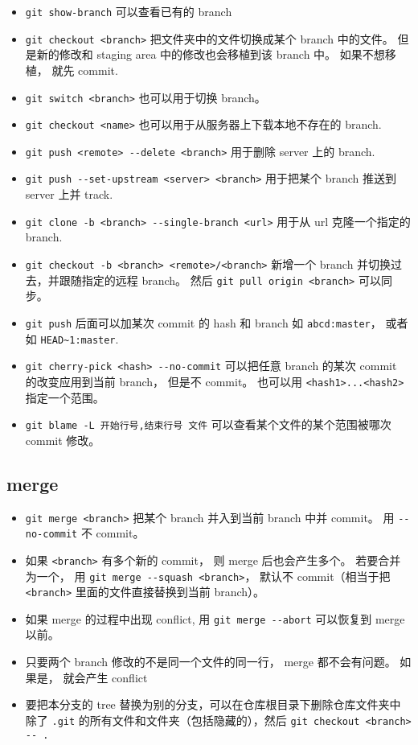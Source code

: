 \begin{itemize}
\item \verb`git show-branch` 可以查看已有的 branch 
\item \verb`git checkout <branch>` 把文件夹中的文件切换成某个 branch 中的文件。 但是新的修改和 staging area 中的修改也会移植到该 branch 中。 如果不想移植， 就先 commit.
\item \verb`git switch <branch>` 也可以用于切换 branch。
\item \verb`git checkout <name>` 也可以用于从服务器上下载本地不存在的 branch.
\item \verb`git push <remote> --delete <branch>` 用于删除 server 上的 branch.
\item \verb`git push --set-upstream <server> <branch>` 用于把某个 branch 推送到 server 上并 track.
\item \verb`git clone -b <branch> --single-branch <url>` 用于从 url 克隆一个指定的 branch.
\item \verb`git checkout -b <branch> <remote>/<branch>` 新增一个 branch 并切换过去，并跟随指定的远程 branch。 然后 \verb`git pull origin <branch>` 可以同步。
\item \verb`git push` 后面可以加某次 commit 的 hash 和 branch 如 \verb`abcd:master`， 或者如 \verb`HEAD~1:master`.
\item \verb`git cherry-pick <hash> --no-commit` 可以把任意 branch 的某次 commit 的改变应用到当前 branch， 但是不 commit。 也可以用 \verb`<hash1>...<hash2>` 指定一个范围。
\item \verb`git blame -L 开始行号,结束行号 文件`  可以查看某个文件的某个范围被哪次 commit 修改。
\end{itemize}

\subsection{merge}
\begin{itemize}
\item \verb`git merge <branch>` 把某个 branch 并入到当前 branch 中并 commit。 用 \verb`--no-commit` 不 commit。
\item 如果 \verb`<branch>` 有多个新的 commit， 则 merge 后也会产生多个。 若要合并为一个， 用 \verb`git merge --squash <branch>`， 默认不 commit（相当于把 \verb`<branch>` 里面的文件直接替换到当前 branch）。
\item 如果 merge 的过程中出现 conflict, 用 \verb`git merge --abort` 可以恢复到 merge 以前。
\item 只要两个 branch 修改的不是同一个文件的同一行， merge 都不会有问题。 如果是， 就会产生 conflict
\item 要把本分支的 tree 替换为别的分支，可以在仓库根目录下删除仓库文件夹中除了 \verb`.git` 的所有文件和文件夹（包括隐藏的），然后 \verb`git checkout <branch> -- .`
\end{itemize}



